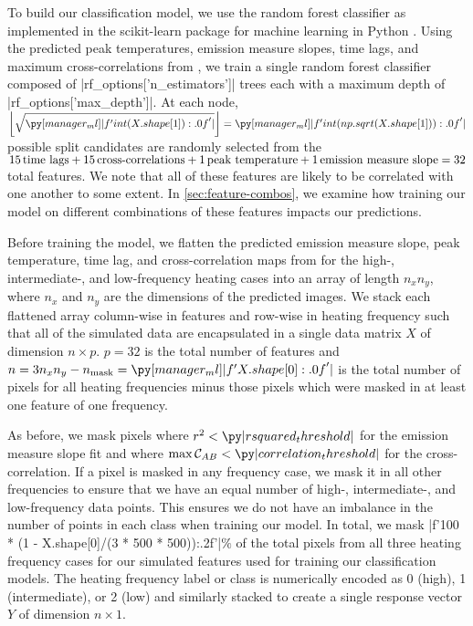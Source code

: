 To build our classification model, we use the random forest classifier as implemented in the scikit-learn package for machine learning in Python \citep{pedregosa_scikit-learn_2011}.
Using the predicted peak temperatures, emission measure slopes, time lags, and maximum cross-correlations from , we train a single random forest classifier composed of \py[manager_ml]|rf_options['n_estimators']| trees each with a maximum depth of \py[manager_ml]|rf_options['max_depth']|.
At each node, $\left\lfloor\sqrt{\py[manager_ml]|f'{int(X.shape[1]):.0f}'|}\right\rfloor=\py[manager_ml]|f'{int(np.sqrt(X.shape[1])):.0f}'|$ possible split candidates are randomly selected from the $15\,\textup{time lags} + 15\,\textup{cross-correlations} + 1\,\textup{peak temperature} + 1\,\textup{emission measure slope}=32$ total features.
We note that all of these features are likely to be correlated with one another to some extent.
In \autoref{sec:feature-combos}, we examine how training our model on different combinations of these features impacts our predictions.

Before training the model, we flatten the predicted emission measure slope, peak temperature, time lag, and cross-correlation maps from  for the high-, intermediate-, and low-frequency heating cases into an array of length $n_xn_y$, where $n_x$ and $n_y$ are the dimensions of the predicted images.
We stack each flattened array column-wise in features and row-wise in heating frequency such that all of the simulated data are encapsulated in a single data matrix $X$ of dimension $n\times p$.
$p=32$ is the total number of features and $n=3n_xn_y - n_\textup{mask}=\py[manager_ml]|f'{X.shape[0]:.0f}'|$ is the total number of pixels for all heating frequencies minus those pixels which were masked in at least one feature of one frequency.

As before, we mask pixels where $r^2<\py|rsquared_threshold|$ for the emission measure slope fit and where $\max\mathcal{C}_{AB}<\py|correlation_threshold|$ for the cross-correlation.
If a pixel is masked in any frequency case, we mask it in all other frequencies to ensure that we have an equal number of high-, intermediate-, and low-frequency data points.
This ensures we do not have an imbalance in the number of points in each class when training our model.
In total, we mask \py[manager_ml]|f'{100 * (1 - X.shape[0]/(3 * 500 * 500)):.2f}'|$\%$ of the total pixels from all three heating frequency cases for our simulated features used for training our classification models.
The heating frequency label or class is numerically encoded as 0 (high), 1 (intermediate), or 2 (low) and similarly stacked to create a single response vector $Y$ of dimension $n\times1$.


